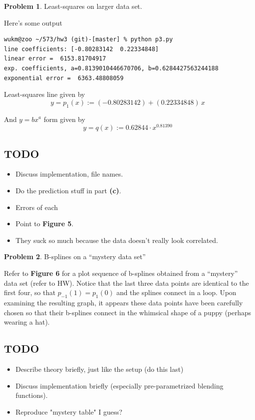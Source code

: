 \documentclass[10pt]{article}
\theoremstyle{plain}
\theoremstyle{definition}
\newtheorem{prob}{Problem}
\numberwithin{equation}{section}
\begin{document}
\begin{prob} Least-squares on larger data set.

Here's some output
\begin{verbatim}
wukm@zoo ~/573/hw3 (git)-[master] % python p3.py
line coefficients: [-0.80283142  0.22334848]
linear error =  6153.81704917
exp. coefficients, a=0.8139010446670706, b=0.6284427563244188
exponential error =  6363.48808059
\end{verbatim}

Least-squares line given by
    \[
            y = p_1(x) := (-0.80283142) + (0.22334848)\,x
    \]

And $y=bx^a$ form given by
    \[
            y = q(x) := 0.62844 \cdot x^{0.81390}
        \]

\subsection*{TODO}
    \begin{itemize}
    \item Discuss implementation, file names.
    \item Do the prediction stuff in part \textbf{(c)}.
    \item Errors of each
    \item Point to \textbf{Figure 5}.
    \item They suck so much because the data doesn't really look correlated.
    \end{itemize}
\end{prob}

\hrulefill

\begin{prob} B-splines on a ``mystery data set''

    Refer to \textbf{Figure 6} for a plot sequence of b-splines obtained from
    a ``mystery'' data set (refer to HW).
    Notice that the last three data points are identical to the first four,
    so that $p_{-1}(1) = p_1(0)$ and the splines connect in a loop.
    Upon examining the resulting graph, it appears these data points have been
    carefully chosen so that their b-splines connect in the whimsical shape of a
    puppy (perhaps wearing a hat).
    
    \subsection*{TODO}
    \begin{itemize}
        \item Describe theory briefly, just like the setup (do this last)
        \item Discuss implementation briefly (especially pre-parametrized blending functions).
        \item Reproduce "mystery table" I guess?
    \end{itemize}

\end{prob}
\end{document}
